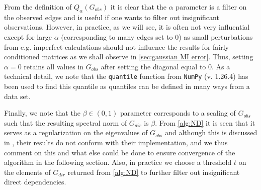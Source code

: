 \documentclass[../Thesis.tex]{subfiles}
\begin{document}
From the definition of $Q_{\alpha}\left(G_{obs}\right)$ it is clear that the $\alpha$ parameter is a filter on the observed edges and is useful if one wants to filter out insignificant observations. However, in practice, as we will see, it is often not very influential except for large $\alpha$ (corresponding to many edges set to $0$) as small perturbations from e.g. imperfect calculations should not influence the results for fairly conditioned matrices as we shall observe in \autoref{sec:gaussian MI error}. Thus, setting $\alpha = 0$ retains all values in $G_{obs}$ after setting the diagonal equal to $0$. As a technical detail, we note that the \texttt{quantile} function from \texttt{NumPy} (v. 1.26.4) has been used to find this quantile as quantiles can be defined in many ways from a data set.

Finally, we note that the $\beta \in (0,1)$ parameter corresponds to a scaling of $G_{obs}$ such that the resulting spectral norm of $G_{dir}$ is $\beta$. From \autoref{alg:ND} it is seen that it serves as a regularization on the eigenvalues of $G_{obs}$ and although this is discussed in \cite{Network-deconvolution-as-a-general-method-to-distinguish-direct-dependencies-in-networks}, their results do not conform with their implementation, and we thus comment on this and what else could be done to ensure convergence of the algorithm in the following section. Also, in practice we choose a threshold $t$ on the elements of $G_{dir}$ returned from \autoref{alg:ND} to further filter out insignificant direct dependencies.
\end{document}
